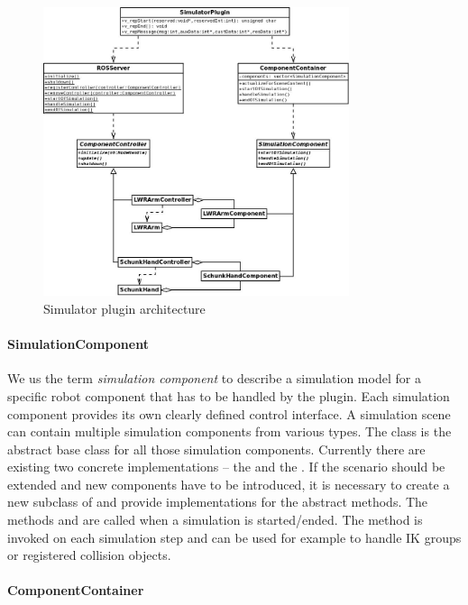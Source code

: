 \begin{figure}
	\centering
  	\includegraphics[width=0.8\textwidth]{images/SimulatorPluginUML.jpg}
	\caption{Simulator plugin architecture}
	\label{fig:plugin_uml}
\end{figure}

\paragraph{SimulationComponent}

We us the term \emph{simulation component} to describe a simulation model for a specific robot component that has to be handled by the plugin. Each simulation component provides its own clearly defined control interface. A simulation scene can contain multiple simulation components from various types. The  class is the abstract base class for all those simulation components. Currently there are existing two concrete implementations -- the  and the . If the scenario should be extended and new components have to be introduced, it is necessary to create a new subclass of  and provide implementations for the abstract methods. The methods  and  are called when a simulation is started/ended. The method  is invoked on each simulation step and can be used for example to handle IK groups or registered collision objects.

\paragraph{ComponentContainer}

